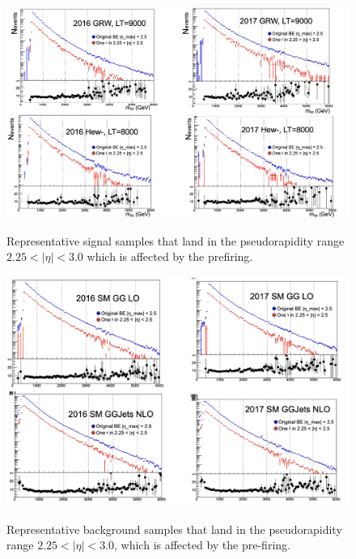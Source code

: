 \begin{figure}[!htbp]
	\centering
     \caption{Representative signal samples that land in the pseudorapidity range $2.25 < |\eta| <3.0$ which is affected by the prefiring.}
	\includegraphics[scale=0.6]{fig/EEL1Prefiring2.png}
	\label{fig:EEL1Prefiringcheck2}
\end{figure}


\begin{figure}[!htbp]
    \centering
      \caption{Representative background samples that land in the pseudorapidity range $2.25 < |\eta| < 3.0$, which is affected by the pre-firing.}
    \includegraphics[scale=0.6]{fig/EEL1Prefiring1.png}
    \label{fig:EEL1Prefiringcheck1}
\end{figure}


